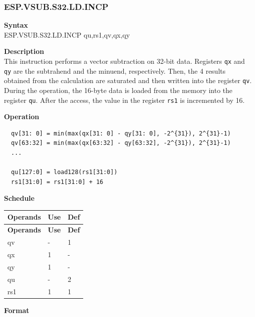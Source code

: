 \newpage
\subsubsection{ESP.VSUB.S32.LD.INCP}\label{instruction:ESPVSUBS32LDINCP}
\textbf{Syntax}\\
ESP.VSUB.S32.LD.INCP qu,rs1,qv,qx,qy

\textbf{Description}\\
This instruction performs a vector subtraction on 32-bit data. Registers \lstinline{qx} and \lstinline{qy} are the subtrahend and the minuend, respectively. Then, the 4 results obtained from the calculation are saturated and then written into the register \lstinline{qv}. \\ During the operation, the 16-byte data is loaded from the memory into the register \lstinline{qu}. After the access, the value in the register \lstinline{rs1} is incremented by 16.

\textbf{Operation}\\
\begin{lstlisting}
  qv[31: 0] = min(max(qx[31: 0] - qy[31: 0], -2^{31}), 2^{31}-1)
  qv[63:32] = min(max(qx[63:32] - qy[63:32], -2^{31}), 2^{31}-1)
  ...

  qu[127:0] = load128(rs1[31:0])
  rs1[31:0] = rs1[31:0] + 16
\end{lstlisting}


\textbf{Schedule}\\
\begin{longtable}[c]{|l|l|l|}
    \hline
    \rowcolor{lightgray}
    \textbf{Operands} & \textbf{Use} & \textbf{Def} \\\hline
    \endfirsthead
    \hline
    \rowcolor{lightgray}
     \textbf{Operands} & \textbf{Use} & \textbf{Def} \\\hline
    \endhead
    \hline
    \endfoot

  qv & - & 1 \\\hline
    qx & 1 & - \\\hline
    qy & 1 & - \\\hline
    qu & - & 2 \\\hline
    rs1 & 1 & 1

\end{longtable}

\textbf{Format}\\

